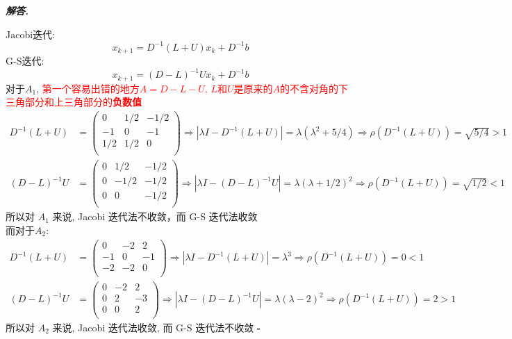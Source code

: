 \documentclass[10pt, a4paper, oneside]{ctexart}
\newenvironment{solution}{%
  \par\noindent\textbf{\textit{解答. }}\ignorespaces
}{%
  \hfill\ensuremath{\square}\par %
}
\begin{document}
\begin{solution}
Jacobi迭代:
$$x_{k+1}=D^{-1}(L+U)x_k+D^{-1}b$$
G-S迭代:
$$x_{k+1}=(D-L)^{-1}Ux_k+D^{-1}b$$
对于$A_1$, \textcolor{red}{第一个容易出错的地方$A=D-L-U$, $L$和$U$是原来的$A$的不含对角的下三角部分和上三角部分的\textbf{负数值}}
\begin{align*}
    D^{-1}(L+U)&=\begin{pmatrix}
        0&1/2&-1/2\\
        -1&0&-1\\
        1/2&1/2&0\\
    \end{pmatrix}\Rightarrow |\lambda I-D^{-1}(L+U)|=\lambda(\lambda^2+5/4)\Rightarrow \rho(D^{-1}(L+U))=\sqrt{5/4}>1\\
   (D-L)^{-1}U&=\begin{pmatrix}
        0&1/2&-1/2\\
        0&-1/2&-1/2\\
        0&0&-1/2\\
    \end{pmatrix}\Rightarrow |\lambda I-(D-L)^{-1}U|=\lambda(\lambda+1/2)^2\Rightarrow \rho(D^{-1}(L+U))=\sqrt{1/2}<1
\end{align*}
所以对 $A_1$ 来说, Jacobi 迭代法不收敛，而 G-S 迭代法收敛\\
而对于$A_2$:
\begin{align*}
    D^{-1}(L+U)&=\begin{pmatrix}
        0&-2&2\\
        -1&0&-1\\
        -2&-2&0\\
    \end{pmatrix}\Rightarrow |\lambda I-D^{-1}(L+U)|=\lambda^3 \Rightarrow \rho(D^{-1}(L+U))=0<1\\
   (D-L)^{-1}U&=\begin{pmatrix}
        0&-2&2\\
        0&2&-3\\
        0&0&2\\
    \end{pmatrix}\Rightarrow |\lambda I-(D-L)^{-1}U|=\lambda(\lambda-2)^2\Rightarrow \rho(D^{-1}(L+U))=2>1
\end{align*}
所以对 $A_2$ 来说, Jacobi 迭代法收敛, 而 G-S 迭代法不收敛
\end{solution}
\end{document}

